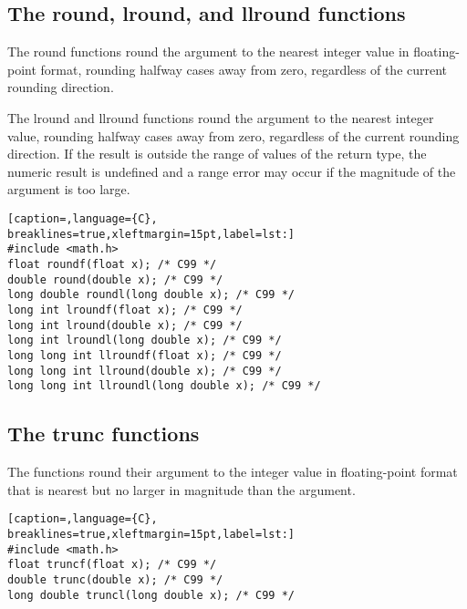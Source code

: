 \subsection{The round, lround, and llround functions}
The round functions round the argument to the nearest integer value in
floating-point format, rounding halfway cases away from zero, regardless of the
current rounding direction.

The lround and llround functions round the argument to the nearest integer
value, rounding halfway cases away from zero, regardless of the current
rounding direction. If the result is outside the range of values of the return
type, the numeric result is undefined and a range error may occur if the
magnitude of the argument is too large.
\lstset{basicstyle=\scriptsize, numbers=left, captionpos=b, tabsize=4}
\begin{lstlisting}[caption=,language={C},
breaklines=true,xleftmargin=15pt,label=lst:]
#include <math.h>
float roundf(float x); /* C99 */
double round(double x); /* C99 */
long double roundl(long double x); /* C99 */
long int lroundf(float x); /* C99 */
long int lround(double x); /* C99 */
long int lroundl(long double x); /* C99 */
long long int llroundf(float x); /* C99 */
long long int llround(double x); /* C99 */
long long int llroundl(long double x); /* C99 */
\end{lstlisting}

\subsection{The trunc functions}
The functions round their argument to the integer value in floating-point
format that is nearest but no larger in magnitude than the argument.
\lstset{basicstyle=\scriptsize, numbers=left, captionpos=b, tabsize=4}
\begin{lstlisting}[caption=,language={C},
breaklines=true,xleftmargin=15pt,label=lst:]
#include <math.h>
float truncf(float x); /* C99 */
double trunc(double x); /* C99 */
long double truncl(long double x); /* C99 */
\end{lstlisting}

